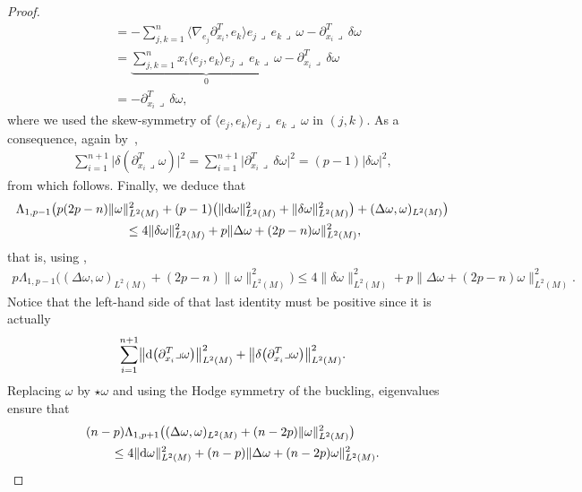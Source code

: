\documentclass[pdftex]{sigma}
\numberwithin{equation}{section}
\theoremstyle{definition}
\begin{document}
\begin{proof}
\begin{align*}
&=-\sum_{j,k=1}^n\bigl\langle\nabla_{e_j}\partial_{x_i}^T,e_k\bigr\rangle e_j\lrcorner\,e_k\lrcorner\,\omega-\partial_{x_i}^T\lrcorner\,\delta\omega\\
&=\underbrace{\sum_{j,k=1}^nx_i\langle e_j,e_k\rangle e_j\lrcorner\,e_k\lrcorner\,\omega}_{0}-\partial_{x_i}^T\lrcorner\,\delta\omega\\
&=-\partial_{x_i}^T\lrcorner\,\delta\omega,
\end{align*}
where we used the skew-symmetry of $\langle e_j,e_k\rangle e_j\lrcorner\,e_k\lrcorner\,\omega$ in $(j,k)$.
As a consequence, again by~\cite[equation~(22)]{EGHM},
\begin{align*}
\sum_{i=1}^{n+1}\bigl|\delta(\partial_{x_i}^T\lrcorner\omega)\bigr|^2=\sum_{i=1}^{n+1}\bigl|\partial_{x_i}^T\lrcorner\,\delta\omega\bigr|^2=(p-1)|\delta\omega|^2,
\end{align*}
from which  follows.
Finally, we deduce that
\begin{gather*}
 \Lambda_{1,p-1}\bigl(p(2p-n)\|\omega\|_{L^2(M)}^2+(p-1)\bigl(\|{\rm d}\omega\|_{L^2(M)}^2+\|\delta\omega\|_{L^2(M)}^2\bigr)+(\Delta\omega,\omega)_{L^2(M)}\bigr)\\
\qquad\leq4\|\delta\omega\|^2_{L^2(M)}+p\|\Delta\omega+(2p-n)\omega\|^2_{L^2(M)},
\end{gather*}
that is, using ,
\begin{gather*}
p\Lambda_{1,p-1}\bigl((\Delta\omega,\omega)_{L^2(M)}+(2p-n)\|\omega\|^2_{L^2(M)}\bigr)\leq 4\|\delta\omega\|^2_{L^2(M)}+p\|\Delta\omega+(2p-n)\omega\|^2_{L^2(M)}.
\end{gather*}
Notice that the left-hand side of that last identity must be positive since it is actually
\[
\sum_{i=1}^{n+1}\bigl\|{\rm d}\bigl(\partial_{x_i}^T\lrcorner\omega\bigr)\bigr\|_{L^2(M)}^2+\bigl\|\delta\bigl(\partial_{x_i}^T\lrcorner\omega\bigr)\bigr\|_{L^2(M)}^2.
\]
Replacing $\omega$ by $\star\omega$ and using the Hodge symmetry of the buckling, eigenvalues ensure that
\begin{gather*}
\begin{split}
&(n-p)\Lambda_{1,p+1}\bigl((\Delta\omega,\omega)_{L^2(M)}+(n-2p)\|\omega\|^2_{L^2(M)}\bigr)\\
& \qquad\leq 4\|{\rm d}\omega\|^2_{L^2(M)}+(n-p)\|\Delta\omega+(n-2p)\omega\|^2_{L^2(M)}.
\end{split}

\end{gather*}
\end{proof}
\end{document}
